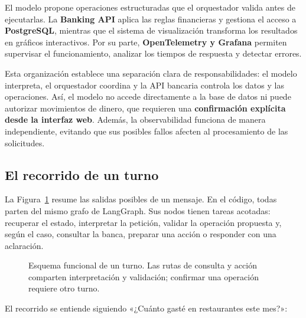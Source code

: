 \documentclass[12pt,a4paper]{article}
\begin{document}
El modelo propone operaciones estructuradas que el orquestador valida antes de ejecutarlas. La \textbf{Banking API} aplica las reglas financieras y gestiona el acceso a \textbf{PostgreSQL}, mientras que el sistema de visualización transforma los resultados en gráficos interactivos. Por su parte, \textbf{OpenTelemetry y Grafana} permiten supervisar el funcionamiento, analizar los tiempos de respuesta y detectar errores.

Esta organización establece una separación clara de responsabilidades: el modelo interpreta, el orquestador coordina y la API bancaria controla los datos y las operaciones. Así, el modelo no accede directamente a la base de datos ni puede autorizar movimientos de dinero, que requieren una \textbf{confirmación explícita desde la interfaz web}. Además, la observabilidad funciona de manera independiente, evitando que sus posibles fallos afecten al procesamiento de las solicitudes.
\subsection{El recorrido de un turno}
La Figura~\ref{fig:orchestrator-trace-lanes} resume las salidas posibles de un mensaje. En el código, todas parten del mismo grafo de LangGraph. Sus nodos tienen tareas acotadas: recuperar el estado, interpretar la petición, validar la operación propuesta y, según el caso, consultar la banca, preparar una acción o responder con una aclaración.

\begin{figure}[H]
\centering

\caption{Esquema funcional de un turno. Las rutas de consulta y acción comparten interpretación y validación; confirmar una operación requiere otro turno.}
\label{fig:orchestrator-trace-lanes}
\end{figure}

El recorrido se entiende siguiendo «¿Cuánto gasté en restaurantes este mes?»:
\end{document}
